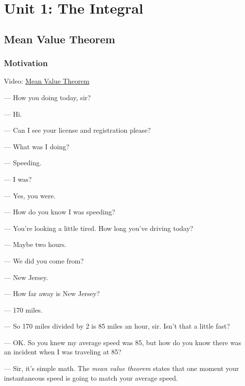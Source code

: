 \documentclass[pdftex, brazil, 12pt, twoside]{article}
\begin{document}
\section{Unit 1: The Integral}
\label{u1}


\subsection{Mean Value Theorem}
\label{u1-mvt}

\subsubsection{Motivation}
\label{u1-mvt-motiv}

Video: \href{https://www.youtube.com/watch?v=9B-XGTaHqXk}{Mean Value Theorem}

--- How you doing today, sir?

--- Hi.

--- Can I see your license and registration please?

--- What was I doing?

--- Speeding.

--- I was?

--- Yes, you were.

--- How do you know I was speeding?

--- You're looking a little tired. How long you've driving today?

--- Maybe two hours.

--- We did you come from?

--- New Jersey.

--- How far away is New Jersey?

--- 170 miles.

--- So 170 miles divided by 2 is 85 miles an hour, sir. Isn't that a little fast?

--- OK. So you knew my average speed was 85, but how do you know there was an incident
when I was traveling at 85?

--- Sir, it's simple math. The \emph{mean value theorem} states that one moment
your instantaneous speed is going to match your average speed.
\end{document}
